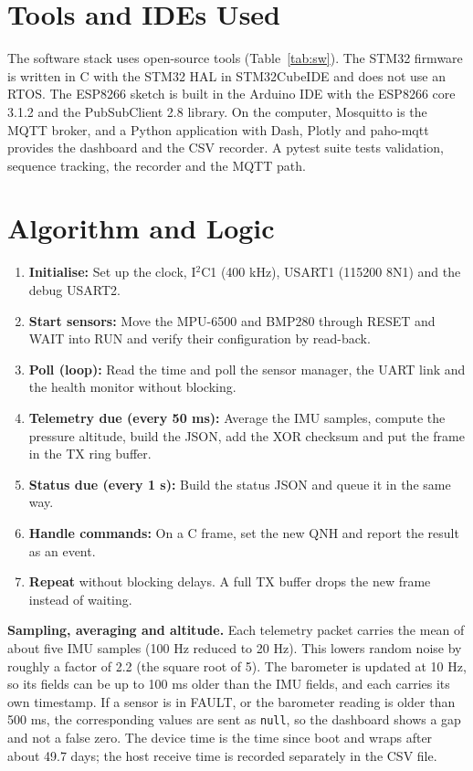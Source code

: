 \documentclass[12pt,a4paper]{report}
\begin{document}
\section{Tools and IDEs Used}
The software stack uses open-source tools (Table~\ref{tab:sw}). The STM32 firmware is written in C with the STM32 HAL in STM32CubeIDE and does not use an RTOS. The ESP8266 sketch is built in the Arduino IDE with the ESP8266 core 3.1.2 and the PubSubClient 2.8 library. On the computer, Mosquitto is the MQTT broker, and a Python application with Dash, Plotly and paho-mqtt provides the dashboard and the CSV recorder. A pytest suite tests validation, sequence tracking, the recorder and the MQTT path.

\section{Algorithm and Logic}
\begin{enumerate}
\item \textbf{Initialise:} Set up the clock, I$^2$C1 (400 kHz), USART1 (115200 8N1) and the debug USART2.
\item \textbf{Start sensors:} Move the MPU-6500 and BMP280 through RESET and WAIT into RUN and verify their configuration by read-back.
\item \textbf{Poll (loop):} Read the time and poll the sensor manager, the UART link and the health monitor without blocking.
\item \textbf{Telemetry due (every 50 ms):} Average the IMU samples, compute the pressure altitude, build the JSON, add the XOR checksum and put the frame in the TX ring buffer.
\item \textbf{Status due (every 1 s):} Build the status JSON and queue it in the same way.
\item \textbf{Handle commands:} On a C frame, set the new QNH and report the result as an event.
\item \textbf{Repeat} without blocking delays. A full TX buffer drops the new frame instead of waiting.
\end{enumerate}

\textbf{Sampling, averaging and altitude.} Each telemetry packet carries the mean of about five IMU samples (100 Hz reduced to 20 Hz). This lowers random noise by roughly a factor of 2.2 (the square root of 5). The barometer is updated at 10 Hz, so its fields can be up to 100 ms older than the IMU fields, and each carries its own timestamp. If a sensor is in FAULT, or the barometer reading is older than 500 ms, the corresponding values are sent as \texttt{null}, so the dashboard shows a gap and not a false zero. The device time is the time since boot and wraps after about 49.7 days; the host receive time is recorded separately in the CSV file.
\end{document}
